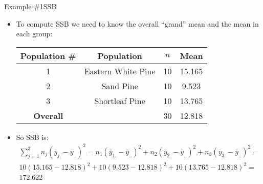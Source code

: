 \documentclass[xcolor=dvipsnames]{beamer}
\begin{document}
\begin{frame}{Example \#1}{SSB}
	\begin{itemize}
		\item To compute SSB we need to know the overall ``grand'' mean and the mean in each group: \pause
		\begin{center}
			\begin{tabular}{|c|c|c|c|}
				\hline
				\textbf{Population \#} & \textbf{Population} & $n$ & \textbf{Mean} \\
				\hline \hline
				1  & Eastern White Pine    &   10 &  15.165 \\ \hline 
				2 &  Sand Pine              & 10 &    9.523\\ \hline 
				3 &  Shortleaf Pine        &  10 &   13.765\\ \hline \hline
				\textbf{Overall} & & 30 & 12.818 \\ \hline
			\end{tabular}
		\end{center}\pause
				\vspace{2mm}
		\item So SSB is: \pause
		\begin{gather*}
		\sum_{j=1}^3 n_j (\bar{y}_{j.} - \bar{y}_{..})^2 = n_1 (\bar{y}_{1.}-\bar{y}_{..})^2 + n_2 (\bar{y}_{2.}-\bar{y}_{..})^2 + n_3 (\bar{y}_{3.}-\bar{y}_{..})^2 =  \\
		 10(15.165 - 12.818)^2 + 10(9.523-12.818)^2 + 10(13.765-12.818)^2 =\\
		 172.622
		\end{gather*}
	\end{itemize}
\end{frame}
\end{document}
